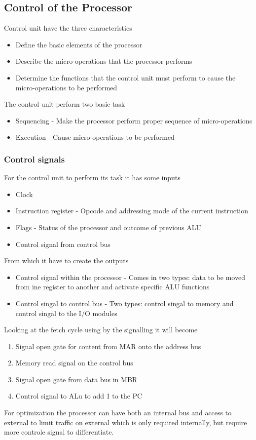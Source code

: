 \documentclass[12pt, a4paper]{article}
\begin{document}
		\subsection{Control of the Processor}
			Control unit have the three characteristics\\
			\begin{itemize}
				\item Define the basic elements of the processor
				\item Describe the micro-operations that the processor performs
				\item Determine the functions that the control unit must perform to cause the micro-operations to be performed
			\end{itemize}
			The control unit perform two basic task
			\begin{itemize}
				\item Sequencing - Make the processor perform proper sequence of micro-operations
				\item Execution - Cause micro-operations to be performed
			\end{itemize}
			\subsubsection{Control signals}
				For the control unit to perform its task it has some inputs
				\begin{itemize}
					\item Clock
					\item Instruction register - Opcode and addressing mode of the current instruction
					\item Flags - Status of the processor and outcome of previous ALU
					\item Control signal from control bus
				\end{itemize}
				From which it have to create the outputs
				\begin{itemize}
					\item Control signal within the processor - Comes in two types: data to be moved from ine register to another and activate specific ALU functions
					\item Control singal to control bus - Two types: control singal to memory and control singal to the I/O modules
				\end{itemize}
				Looking at the fetch cycle using by the signalling it will become
				\begin{enumerate}
					\item Signal open gate for content from MAR onto the address bus
					\item Memory read signal on the control bus
					\item Signal open gate from data bus in MBR
					\item Control signal to ALu to add 1 to the PC
				\end{enumerate}
				For optimization the processor can have both an internal bus and access to external to limit traffic on external which is only required internally, but require more controle signal to differentiate.
\end{document}
